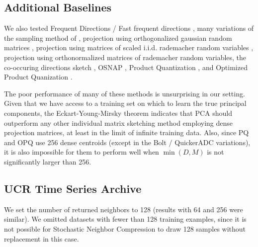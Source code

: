 \subsection{Additional Baselines}

We also tested Frequent Directions / Fast frequent directions \cite{liberty_simple_2012, ghashami_frequent_2016, isvd}, many variations of the sampling method of \cite{drineas_fast_2006}, projection using orthogonalized gaussian random matrices \cite{superbitLSH}, projection using matrices of scaled i.i.d. rademacher random variables \cite{rademacherJL}, projection using orthonormalized matrices of rademacher random variables, the co-occuring directions sketch \cite{mroueh_co-occuring_2016}, OSNAP \cite{osnap}, Product Quantization \cite{pq}, and Optimized Product Quanization \cite{opq}.

The poor performance of many of these methods is unsurprising in our setting. Given that we have access to a training set on which to learn the true principal components, the Eckart-Young-Mirsky theorem \cite{eckartYoungMirskyThm} indicates that PCA should outperform any other individual matrix sketching method employing dense projection matrices, at least in the limit of infinite training data. Also, since PQ and OPQ use 256 dense centroids (except in the Bolt / QuickerADC variations), it is also impossible for them to perform well when $\min(D, M)$ is not significantly larger than 256.

\subsection{UCR Time Series Archive}

We set the number of returned neighbors to 128 (results with 64 and 256 were similar). We omitted datasets with fewer than 128 training examples, since it is not possible for Stochastic Neighbor Compression to draw 128 samples without replacement in this case.

